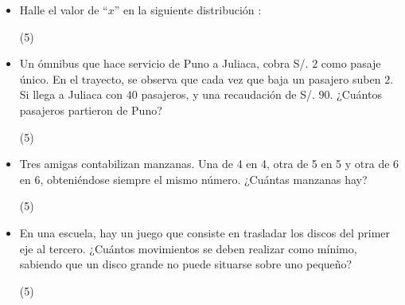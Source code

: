 \documentclass[10pt, twocolumn, landscape, a4paper]{article}
\begin{document}
\begin{itemize}
{\begin{tasks}
\end{tasks}
}
\item{Halle el valor de ``$x$'' en la siguiente distribución :
\begin{tasks}(5)
\end{tasks}}
\item{Un ómnibus que hace servicio de Puno a Juliaca, cobra S/. $2$ como pasaje único. En el trayecto, se observa que cada vez que baja un pasajero suben $2$. Si llega a Juliaca con $40$ pasajeros, y una recaudación de S/. $90$. ¿Cuántos pasajeros partieron de Puno?
\begin{tasks}(5)
\end{tasks}
}
\item{Tres amigas contabilizan manzanas. Una de 4 en 4, otra de 5 en 5 y otra de 6 en 6, obteniéndose siempre el mismo número. ¿Cuántas manzanas hay?
\begin{tasks}(5)
\end{tasks}
}
\item{En una escuela, hay un juego que consiste en trasladar los discos del primer eje al tercero. ¿Cuántos movimientos se deben realizar como mínimo, sabiendo que un disco grande no puede situarse sobre uno pequeño?
\begin{tasks}(5)
\end{tasks}}


\end{itemize}
\end{document}
